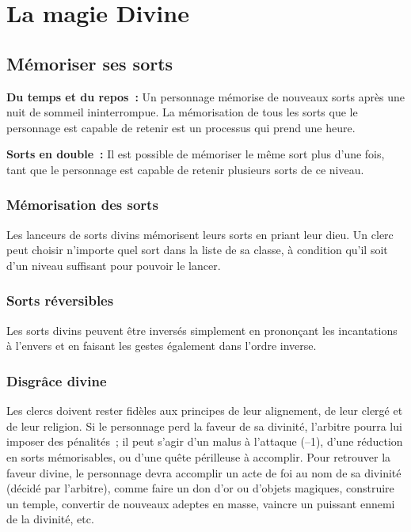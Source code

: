 \section{La magie Divine}
\subsection{Mémoriser ses sorts}\label{muxe9moriser-ses-sorts}

\textbf{Du temps et du repos~:} Un personnage mémorise de nouveaux sorts
après une nuit de sommeil ininterrompue. La mémorisation de tous les
sorts que le personnage est capable de retenir est un processus qui
prend une heure.

\textbf{Sorts en double~:} Il est possible de mémoriser le même sort
plus d'une fois, tant que le personnage est capable de retenir plusieurs
sorts de ce niveau.


\subsubsection{Mémorisation des sorts}\label{muxe9morisation-des-sorts}

Les lanceurs de sorts divins mémorisent leurs sorts en priant leur dieu.
Un clerc peut choisir n'importe quel sort dans la liste de sa classe, à
condition qu'il soit d'un niveau suffisant pour pouvoir le lancer.

\subsubsection{Sorts réversibles}\label{sorts-ruxe9versibles}

Les sorts divins peuvent être inversés simplement en prononçant les
incantations à l'envers et en faisant les gestes également dans l'ordre
inverse.

\subsubsection{Disgrâce divine}\label{disgruxe2ce-divine}

Les clercs doivent rester fidèles aux principes de leur alignement, de
leur clergé et de leur religion. Si le personnage perd la faveur de sa
divinité, l'arbitre pourra lui imposer des pénalités~; il peut s'agir
d'un malus à l'attaque (--1), d'une réduction en sorts mémorisables, ou
d'une quête périlleuse à accomplir. Pour retrouver la faveur divine, le
personnage devra accomplir un acte de foi au nom de sa divinité (décidé
par l'arbitre), comme faire un don d'or ou d'objets magiques, construire
un temple, convertir de nouveaux adeptes en masse, vaincre un puissant
ennemi de la divinité, etc.

